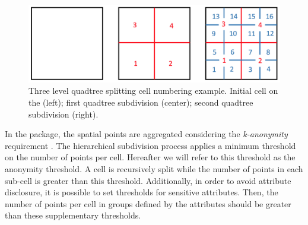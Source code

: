 \begin{figure}[ht!]
\centering
\includegraphics[width=0.8\linewidth]{images/Fig1.png}
\caption{\label{fig:Fig1} Three level quadtree splitting cell numbering example. Initial cell on the (left);  first quadtree subdivision (center); second quadtree subdivision (right).}
\end{figure}

In the  package, the spatial points are aggregated considering the \emph{k-anonymity} requirement \citep{Vu2012}. The hierarchical subdivision process applies a minimum threshold on the number of points per cell. Hereafter we will refer to this threshold as the anonymity threshold. A cell is recursively split while the number of points in each sub-cell is greater than this threshold. Additionally, in order to avoid attribute disclosure, it is possible to set thresholds for sensitive attributes. Then, the number of points per cell in groups defined by the attributes should be greater than these supplementary thresholds.

